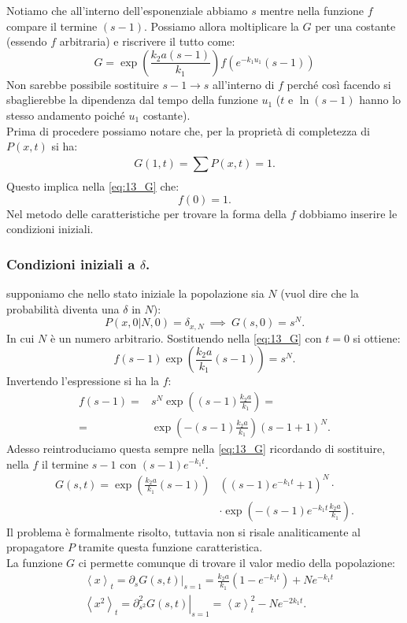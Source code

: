 Notiamo che all'interno dell'esponenziale abbiamo $s$ mentre nella funzione $f$ compare il termine $(s-1)$. Possiamo allora moltiplicare la $G$ per una costante (essendo $f$ arbitraria) e riscrivere il tutto come:
\begin{equation}
    G = \exp\left(\frac{k_2a(s-1) }{k_1}\right)f(e^{-k_1u_1}(s-1) ) \label{eq:13_G}
\end{equation}
Non sarebbe possibile sostituire $s-1 \to s$ all'interno di $f$ perché così facendo si sbaglierebbe la dipendenza dal tempo della funzione $u_1$ ($t$ e $\ln (s-1)$ hanno lo stesso andamento poiché $u_1$ costante).\\
Prima di procedere possiamo notare che, per la proprietà di completezza di $P(x,t)$ si ha:
\[
    G(1,t) = \sum_{}^{} P(x,t) = 1
.\] 
Questo implica nella \ref{eq:13_G} che:
\[
    f(0) = 1
.\] 
Nel metodo delle caratteristiche per trovare la forma della $f$ dobbiamo inserire le condizioni iniziali. 
\subsubsection{Condizioni iniziali a $\delta$.}%
\label{subsub:Condizioni iniziali delta}
supponiamo che nello stato iniziale la popolazione sia $N$ (vuol dire che la probabilità diventa una $\delta$ in $N$):
\[
    P(x,0|N,0) = \delta_{x,N}  \ \implies  \  G(s,0) = s^N
.\] 
In cui $N$ è un numero arbitrario. Sostituendo nella \ref{eq:13_G} con $t=0$ si ottiene:
\[
    f(s-1) \exp\left(\frac{k_2a}{k_1}(s-1)\right) = s^N
.\] 
Invertendo l'espressione si ha la $f$:
\[\begin{aligned}
    f(s-1) =& s^N\exp\left((s-1) \frac{k_2a}{k_1}\right) =\\
    =& \exp\left(-(s-1) \frac{k_2a}{k_1}\right)(s-1 + 1) ^N
.\end{aligned}\]
Adesso reintroduciamo questa sempre nella \ref{eq:13_G} ricordando di sostituire, nella $f$ il termine $s-1$ con $(s-1) e^{-k_1t}$.
\[\begin{aligned}
    G(s,t) = \exp\left(\frac{k_2a}{k_1}(s-1)\right)& ((s-1) e^{-k_1t} + 1)^N \cdot  \\ 
	    &\cdot \exp\left(-(s-1)e^{-k_1t} \frac{k_2a}{k_1}\right)
.\end{aligned}\]
Il problema è formalmente risolto, tuttavia non si risale analiticamente al propagatore $P$ tramite questa funzione caratteristica. \\
La funzione $G$  ci permette comunque di trovare il valor medio della popolazione:
\[\begin{aligned}
    &\left<x\right>_t = \left.\partial_{s}G(s,t)\right|_{s=1} =\frac{k_2a}{k_1}(1-e^{-k_1t}) + Ne^{-k_1t}\\
    &\left<x^2\right>_t = \left.\partial^2_{s^2}G(s,t)\right|_{s=1} = \left<x\right>_t^2 - Ne^{-2k_1t}
.\end{aligned}\]
